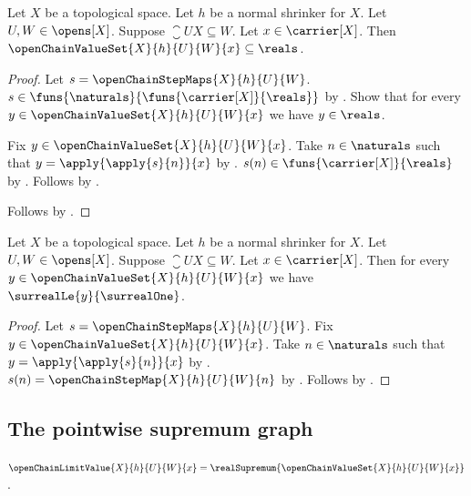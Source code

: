 \begin{proposition}\label{open_chain_value_set_subset_reals}
    Let $X$ be a topological space.
    Let $h$ be a normal shrinker for $X$.
    Let $U,W\in\opens[X]$.
    Suppose $\closure{U}{X}\subseteq W$.
    Let $x\in\carrier[X]$.
    Then $\openChainValueSet{X}{h}{U}{W}{x}\subseteq\reals$.
\end{proposition}
\begin{proof}
    Let $s=\openChainStepMaps{X}{h}{U}{W}$.
    $s\in\funs{\naturals}{\funs{\carrier[X]}{\reals}}$
        by .
    Show that for every $y\in\openChainValueSet{X}{h}{U}{W}{x}$
        we have $y\in\reals$.
    \begin{subproof}
        Fix $y\in\openChainValueSet{X}{h}{U}{W}{x}$.
        Take $n\in\naturals$ such that $y=\apply{\apply{s}{n}}{x}$
            by .
        $s(n)\in\funs{\carrier[X]}{\reals}$
            by .
        Follows by .
    \end{subproof}
    Follows by .
\end{proof}

\begin{proposition}\label{open_chain_value_set_bounded_by_one}
    Let $X$ be a topological space.
    Let $h$ be a normal shrinker for $X$.
    Let $U,W\in\opens[X]$.
    Suppose $\closure{U}{X}\subseteq W$.
    Let $x\in\carrier[X]$.
    Then for every $y\in\openChainValueSet{X}{h}{U}{W}{x}$ we have
        $\surrealLe{y}{\surrealOne}$.
\end{proposition}
\begin{proof}
    Let $s=\openChainStepMaps{X}{h}{U}{W}$.
    Fix $y\in\openChainValueSet{X}{h}{U}{W}{x}$.
    Take $n\in\naturals$ such that $y=\apply{\apply{s}{n}}{x}$
        by .
    $s(n)=\openChainStepMap{X}{h}{U}{W}{n}$
        by .
    Follows by .
\end{proof}

\subsection{The pointwise supremum graph}

\begin{definition}\label{open_chain_limit_value}
    $\openChainLimitValue{X}{h}{U}{W}{x}
        =\realSupremum{\openChainValueSet{X}{h}{U}{W}{x}}$.
\end{definition}

